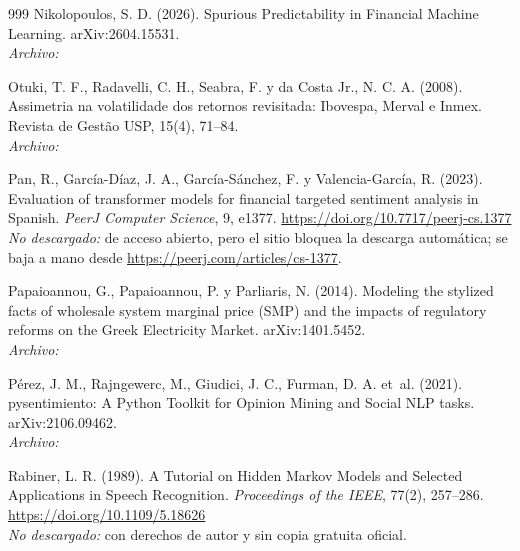\begin{thebibliography}{999}
Nikolopoulos, S. D. (2026). Spurious Predictability in Financial Machine Learning. arXiv:2604.15531.
\\\textit{Archivo:} 

Otuki, T. F., Radavelli, C. H., Seabra, F. y da Costa Jr., N. C. A. (2008). Assimetria na volatilidade dos retornos revisitada: Ibovespa, Merval e Inmex. Revista de Gestão USP, 15(4), 71–84.
\\\textit{Archivo:} 

Pan, R., Garc{\'i}a-D{\'i}az, J. A., Garc{\'i}a-S{\'a}nchez, F. y Valencia-Garc{\'i}a, R. (2023). Evaluation of transformer models for financial targeted sentiment analysis in {Spanish}. \emph{PeerJ Computer Science}, 9, e1377. \url{https://doi.org/10.7717/peerj-cs.1377}
\\\textit{No descargado:} de acceso abierto, pero el sitio bloquea la descarga automática; se baja a mano desde \url{https://peerj.com/articles/cs-1377}.

Papaioannou, G., Papaioannou, P. y Parliaris, N. (2014). Modeling the stylized facts of wholesale system marginal price (SMP) and the impacts of regulatory reforms on the Greek Electricity Market. arXiv:1401.5452.
\\\textit{Archivo:} 

P{\'e}rez, J. M., Rajngewerc, M., Giudici, J. C., Furman, D. A. et~al. (2021). pysentimiento: A Python Toolkit for Opinion Mining and Social {NLP} tasks. arXiv:2106.09462.
\\\textit{Archivo:} 

Rabiner, L. R. (1989). A Tutorial on Hidden {Markov} Models and Selected Applications in Speech Recognition. \emph{Proceedings of the IEEE}, 77(2), 257--286. \url{https://doi.org/10.1109/5.18626}
\\\textit{No descargado:} con derechos de autor y sin copia gratuita oficial.


\end{thebibliography}
